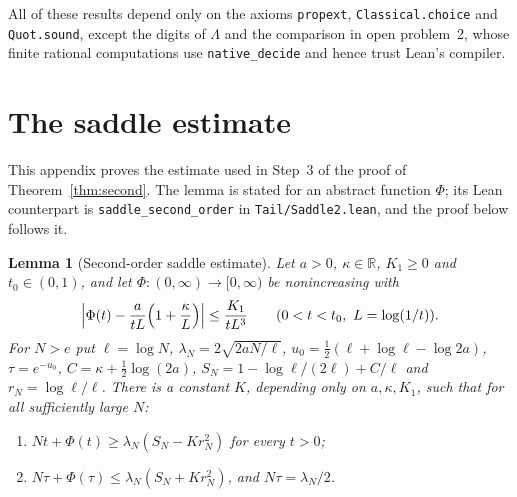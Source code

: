 \documentclass[11pt]{article}
\newtheorem{lemma}[theorem]{Lemma}
\theoremstyle{remark}
\begin{document}
All of these results depend only on the axioms \texttt{propext},
\texttt{Classical.choice} and \texttt{Quot.sound}, except the digits of
$\Lambda$ and the comparison in open problem~2, whose finite rational
computations use \texttt{native\_decide} and hence trust Lean's
compiler.

\appendix
\section{The saddle estimate}\label{app:saddle}

This appendix proves the estimate used in Step~3 of the proof of
Theorem~\ref{thm:second}. The lemma is stated for an abstract function
$\Phi$; its Lean counterpart is \texttt{saddle\_second\_order} in
\texttt{Tail/Saddle2.lean}, and the proof below follows it.

\begin{lemma}[Second-order saddle estimate]\label{lem:saddle}
Let $a>0$, $\kappa\in\mathbb R$, $K_1\ge0$ and $t_0\in(0,1)$, and let
$\Phi:(0,\infty)\to[0,\infty)$ be nonincreasing with
\begin{equation}\label{eq:saddle-hyp}
  \Bigl|\Phi(t)-\frac{a}{tL}\Bigl(1+\frac{\kappa}{L}\Bigr)\Bigr|
  \le\frac{K_1}{tL^3}\qquad(0<t<t_0,\ L=\log(1/t)).
\end{equation}
For $N>e$ put $\ell=\log N$, $\lambda_N=2\sqrt{2aN/\ell}$,
$u_0=\frac12(\ell+\log\ell-\log2a)$, $\tau=e^{-u_0}$,
$C=\kappa+\frac12\log(2a)$,
$S_N=1-\log\ell/(2\ell)+C/\ell$ and $r_N=\log\ell/\ell$. There is a
constant $K$, depending only on $a,\kappa,K_1$, such that for all
sufficiently large $N$:
\begin{enumerate}
\item[(i)] $Nt+\Phi(t)\ge\lambda_N(S_N-Kr_N^2)$ for every $t>0$;
\item[(ii)] $N\tau+\Phi(\tau)\le\lambda_N(S_N+Kr_N^2)$, and
  $N\tau=\lambda_N/2$.
\end{enumerate}
\end{lemma}
\end{document}
